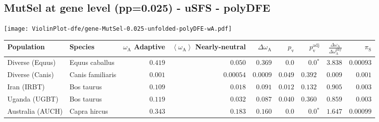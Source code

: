\subsection{MutSel at gene level (pp=0.025) - uSFS - polyDFE} 
\begin{center}
\texttt{[image: ViolinPlot-dfe/gene-MutSel-0.025-unfolded-polyDFE-wA.pdf]} 
\begin{adjustbox}{width = 1\textwidth}
\begin{tabular}{|l|l|r|r|r|r|r|r|r|}
\toprule
                     Population &              Species & \specialcell{$\omega_{\mathrm{A}}$ \\ Adaptive} & \specialcell{$\left< \omega_{\mathrm{A}} \right>$ \\ Nearly-neutral} & $\Delta \omega_{\mathrm{A}} $ & $p_{\mathrm{v}}$ & $p_{\mathrm{v}}^{\mathrm{adj}}$ & $\frac{\Delta\omega_{\mathrm{A}}}{\Delta\omega_{\mathrm{A}}^{\mathrm{phy}}}$ & $\pi_{\textrm{S}}$ \\
\midrule
                Diverse (Equus) &       Equus caballus &                                        $ 0.419$ &                                           $ 0.050$ &                      $ 0.369$ &            $0.0$ &                  $\bm{0.0{^*}}$ &                                           $ 3.838$ &          $0.00093$ \\
                Diverse (Canis) &     Canis familiaris &                                        $ 0.001$ &                                          $0.00054$ &                      $0.0009$ &         $ 0.049$ &                      $ 0.392~~$ &                                           $ 0.009$ &           $ 0.001$ \\
                    Iran (IRBT) &           Bos taurus &                                        $ 0.109$ &                                           $ 0.018$ &                      $ 0.091$ &         $ 0.012$ &                      $ 0.132~~$ &                                           $ 0.905$ &           $ 0.003$ \\
                  Uganda (UGBT) &           Bos taurus &                                        $ 0.119$ &                                           $ 0.032$ &                      $ 0.087$ &         $ 0.040$ &                      $ 0.360~~$ &                                           $ 0.859$ &           $ 0.003$ \\
               Australia (AUCH) &         Capra hircus &                                        $ 0.343$ &                                           $ 0.183$ &                      $ 0.160$ &            $0.0$ &                  $\bm{0.0{^*}}$ &                                           $ 1.647$ &          $0.00099$ \\

\end{tabular}
\end{adjustbox}
\end{center}
